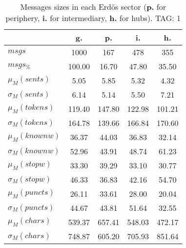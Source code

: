 \begin{table}[h!]
\begin{center}
\begin{tabular}{| l || c | c | c | c |}\hline
 & {\bf g.} & {\bf p.} & {\bf i.} & {\bf h.} \\\hline\hline
$msgs$ & 1000  & 167  & 478  & 355 \\
$msgs_{\%}$ & 100.00  & 16.70  & 47.80  & 35.50 \\\hline
$\mu_M(sents)$ & 5.05  & 5.85  & 5.32  & 4.32 \\
$\sigma_M(sents)$ & 6.14  & 5.14  & 5.50  & 7.21 \\\hline
$\mu_M(tokens)$ & 119.40  & 147.80  & 122.98  & 101.21 \\
$\sigma_M(tokens)$ & 164.78  & 139.66  & 166.84  & 170.60 \\\hline
$\mu_M(knownw)$ & 36.37  & 44.03  & 36.83  & 32.14 \\
$\sigma_M(knownw)$ & 52.96  & 43.91  & 48.74  & 61.23 \\\hline
$\mu_M(stopw)$ & 33.30  & 39.29  & 33.10  & 30.77 \\
$\sigma_M(stopw)$ & 46.33  & 36.83  & 42.16  & 54.70 \\\hline
$\mu_M(puncts)$ & 26.11  & 33.61  & 28.00  & 20.04 \\
$\sigma_M(puncts)$ & 44.67  & 43.81  & 51.64  & 32.55 \\\hline
$\mu_M(chars)$ & 539.37  & 657.41  & 548.03  & 472.17 \\
$\sigma_M(chars)$ & 748.87  & 605.20  & 705.93  & 851.64 \\\hline
\end{tabular}
\caption{Messages sizes in each Erd\"os sector ({{\bf p.}} for periphery, {{\bf i.}} for intermediary, {{\bf h.}} for hubs). TAG: 1}
\end{center}
\end{table}